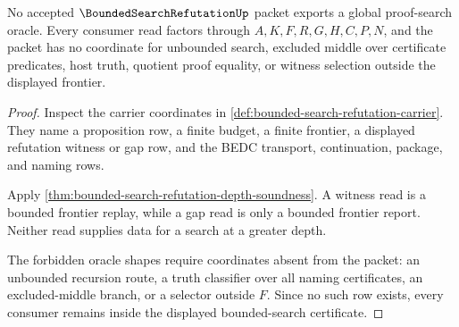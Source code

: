 \begin{theorem}
\label{thm:bounded-search-refutation-nonescape}
No accepted $\BoundedSearchRefutationUp$ packet exports a global proof-search oracle. Every consumer read factors through $A,K,F,R,G,H,C,P,N$, and the packet has no coordinate for unbounded search, excluded middle over certificate predicates, host truth, quotient proof equality, or witness selection outside the displayed frontier.
\end{theorem}
\begin{proof}
Inspect the carrier coordinates in \autoref{def:bounded-search-refutation-carrier}. They name a proposition row, a finite budget, a finite frontier, a displayed refutation witness or gap row, and the BEDC transport, continuation, package, and naming rows.

Apply \autoref{thm:bounded-search-refutation-depth-soundness}. A witness read is a bounded frontier replay, while a gap read is only a bounded frontier report. Neither read supplies data for a search at a greater depth.

The forbidden oracle shapes require coordinates absent from the packet: an unbounded recursion route, a truth classifier over all naming certificates, an excluded-middle branch, or a selector outside $F$. Since no such row exists, every consumer remains inside the displayed bounded-search certificate.
\end{proof}

